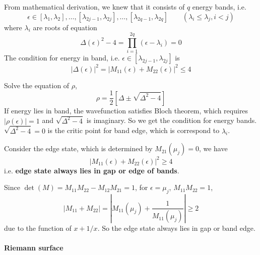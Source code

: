 \documentclass[12pt,a4paper]{article}
\begin{document}
    From mathematical derivation, we knew that it consists of $q$ energy bands, i.e.
    \[
        \epsilon \in
        [\lambda_1, \lambda_2], \dots, [\lambda_{2j-1}, \lambda_{2j}], \dots, [\lambda_{2q-1}, \lambda_{2q}]
        \qquad (\lambda_i\leq\lambda_j, i<j)
    \]
    where $\lambda_i$ are roots of equation
    \[
        \Delta(\epsilon)^2 - 4
        = \prod_{i=1}^{2q} (\epsilon-\lambda_i)
        = 0
    \]
    The condition for energy in band, i.e. $\epsilon\in[\lambda_{2j-1}, \lambda_{2j}]$ is
    \begin{equation}
        |\Delta(\epsilon)|^2
        = \left|M_{11}(\epsilon) + M_{22}(\epsilon)\right|^2 \leq 4
    \end{equation}
    \begin{prf}
        Solve the equation of $\rho$,
        \[
            \rho = \frac{1}{2} \left[
                \Delta \pm \sqrt{\Delta^2 - 4}
            \right]
        \]
        If energy lies in band, the wavefunction satisfies Bloch theorem, which requires $|\rho(\epsilon)|=1$ and $\sqrt{\Delta^2 - 4}$ is imaginary. So we get the condition for energy bands. $\sqrt{\Delta^2 - 4} = 0$ is the critic point for band edge, which is correspond to $\lambda_i$.
    \end{prf}

    Consider the edge state, which is determined by $M_{21}(\mu_j) = 0$, we have
    \[
        \left|M_{11}(\epsilon) + M_{22}(\epsilon)\right|^2 \geq 4
    \]
    i.e. \textbf{edge state always lies in gap or edge of bands}.
    \begin{prf}
        Since $\det(M) = M_{11}M_{22}-M_{12}M_{21} = 1$, for $\epsilon=\mu_j$, $M_{11}M_{22}=1$,
        \[
            \left|M_{11} + M_{22}\right|
            = \left|M_{11}(\mu_j) + \frac{1}{M_{11}(\mu_j)}\right|
            \geq 2
        \]
        due to the function of $x+1/x$. So the edge state always lies in gap or band edge.
    \end{prf}


\paragraph{Riemann surface}
\end{document}
